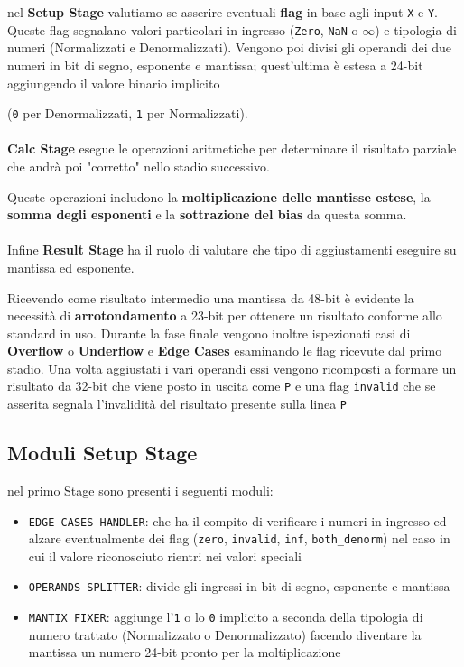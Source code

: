 \documentclass[twoside,11pt]{article}
\begin{document}
nel \textbf{Setup Stage} valutiamo se asserire eventuali \textbf{flag} in base agli input \verb|X| e \verb|Y|.
Queste flag segnalano valori particolari in ingresso (\verb|Zero|, \verb|NaN| o $\infty$) e tipologia di numeri (Normalizzati e Denormalizzati).
Vengono poi divisi gli operandi dei due numeri in bit di segno, esponente e mantissa; quest'ultima è estesa a 24-bit aggiungendo il valore binario implicito {(\verb|0| per Denormalizzati, \verb|1| per Normalizzati).\\\\
\textbf{Calc Stage} esegue le operazioni aritmetiche per determinare il risultato parziale che andrà poi "corretto" nello stadio successivo.

Queste operazioni includono la \textbf{moltiplicazione delle mantisse estese}, la \textbf{somma degli esponenti} e la \textbf{sottrazione del bias} da questa somma.
\\\\
Infine \textbf{Result Stage} ha il ruolo di valutare che tipo di aggiustamenti eseguire su mantissa ed esponente.

Ricevendo come risultato intermedio una mantissa da 48-bit è evidente la necessità di \textbf{arrotondamento} a 23-bit per ottenere un risultato conforme allo standard in uso. Durante la fase finale vengono inoltre ispezionati casi di \textbf{Overflow} o \textbf{Underflow} e \textbf{Edge Cases} esaminando le flag ricevute dal primo stadio. Una volta aggiustati i vari operandi essi vengono ricomposti a formare un risultato da 32-bit che viene posto in uscita come \verb|P| e una flag \verb|invalid| che se asserita segnala l’invalidità del risultato presente sulla linea \verb|P|

\subsection{Moduli Setup Stage}
nel primo Stage sono presenti i seguenti moduli:
\begin{itemize}[noitemsep]
    \item \verb|EDGE CASES HANDLER|: che ha il compito di verificare i numeri in ingresso ed alzare eventualmente dei flag (\verb|zero|, \verb|invalid|, \verb|inf|, \verb|both_denorm|) nel caso in cui il valore riconosciuto rientri nei valori speciali
    \item \verb|OPERANDS SPLITTER|: divide gli ingressi in bit di segno, esponente e mantissa
    \item \verb|MANTIX FIXER|: aggiunge l’\verb|1| o lo \verb|0| implicito a seconda della tipologia di numero trattato (Normalizzato o Denormalizzato) facendo diventare la mantissa un numero 24-bit pronto per la moltiplicazione
\end{itemize}

}
\end{document}
